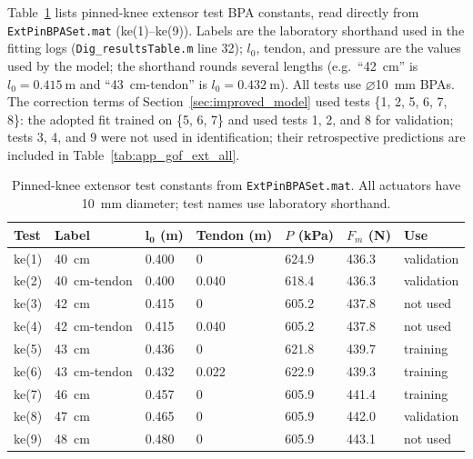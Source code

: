 Table~\ref{tab:app_extpin_tests} lists pinned-knee extensor test BPA constants, read directly from \nolinkurl{ExtPinBPASet.mat} (ke(1)--ke(9)). Labels are the laboratory shorthand used in the fitting logs (\nolinkurl{Dig_resultsTable.m} line 32); $l_{0}$, tendon, and pressure are the values used by the model; the shorthand rounds several lengths (e.g.\ ``\qty{42}{\cm}'' is $l_{0}=\qty{0.415}{\meter}$ and ``\qty{43}{\cm}-tendon'' is $l_{0}=\qty{0.432}{\meter}$). All tests use $\diameter$\qty{10}{\mm} BPAs. The correction terms of Section~\ref{sec:improved_model} used tests \{1, 2, 5, 6, 7, 8\}: the adopted fit trained on \{5, 6, 7\} and used tests 1, 2, and 8 for validation; tests 3, 4, and 9 were not used in identification; their retrospective predictions are included in Table~\ref{tab:app_gof_ext_all}.

\begin{table}[htbp]
\caption{Pinned-knee extensor test constants from \nolinkurl{ExtPinBPASet.mat}. All actuators have \qty{10}{\mm} diameter; test names use laboratory shorthand.}
\label{tab:app_extpin_tests}
\begin{tabular}{@{}lllllll@{}}
\toprule
\textbf{Test} & \textbf{Label} & $\boldsymbol{l_{0}}$ (\unit{\meter}) & Tendon (\unit{\meter}) & $P$ (\unit{\kPa}) & $F_{m}$ (\unit{\newton}) & \textbf{Use} \\
\midrule
ke(1) & \qty{40}{\cm}          & 0.400 & 0     & 624.9 & 436.3 & validation \\
ke(2) & \qty{40}{\cm}-tendon   & 0.400 & 0.040 & 618.4 & 436.3 & validation \\
ke(3) & \qty{42}{\cm}          & 0.415 & 0     & 605.2 & 437.8 & not used \\
ke(4) & \qty{42}{\cm}-tendon   & 0.415 & 0.040 & 605.2 & 437.8 & not used \\
ke(5) & \qty{43}{\cm}          & 0.436 & 0     & 621.8 & 439.7 & training \\
ke(6) & \qty{43}{\cm}-tendon   & 0.432 & 0.022 & 622.9 & 439.3 & training \\
ke(7) & \qty{46}{\cm}          & 0.457 & 0     & 605.9 & 441.4 & training \\
ke(8) & \qty{47}{\cm}          & 0.465 & 0     & 605.9 & 442.0 & validation \\
ke(9) & \qty{48}{\cm}          & 0.480 & 0     & 605.9 & 443.1 & not used \\
\bottomrule
\end{tabular}
\end{table}

